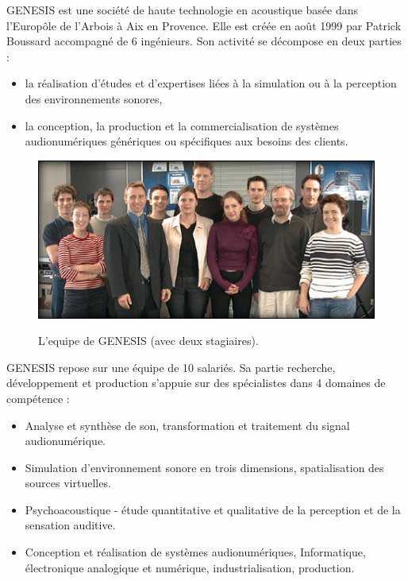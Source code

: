 GENESIS est une soci{\'e}t{\'e} de haute technologie en acoustique bas{\'e}e
dans l'Europ{\^o}le de l'Arbois {\`a} Aix en Provence. Elle est cr{\'e}{\'e}e en
ao{\^u}t 1999 par Patrick Boussard accompagn{\'e} de 6 ing{\'e}nieurs. Son
activit{\'e} se d{\'e}compose en deux parties :\\

\begin{itemize}
   \item la r{\'e}alisation d'{\'e}tudes et d'expertises li{\'e}es {\`a} la simulation
         ou {\`a} la perception des environnements sonores,\\

   \item la conception, la production et la commercialisation de syst{\`e}mes
    audionum{\'e}riques g{\'e}n{\'e}riques ou sp{\'e}cifiques aux besoins des clients.\\
\end{itemize}

\begin{figure}[h]
    \centering
    \includegraphics[width=12cm]{figures/equipe.png}\\
    \caption{L'equipe de GENESIS (avec deux stagiaires).}
    \label{equipe}
\end{figure}

GENESIS repose sur une {\'e}quipe de 10 salari{\'e}s. Sa partie recherche,
d{\'e}veloppement et production s'appuie sur des sp{\'e}cialistes dans 4
domaines de comp{\'e}tence :\\

\begin{itemize}
    \item Analyse et synth{\`e}se de son, transformation et traitement du signal
          audionum{\'e}rique.\\

    \item Simulation d'environnement sonore en trois dimensions, spatialisation
          des sources virtuelles.\\

    \item Psychoacoustique - {\'e}tude quantitative et qualitative de la perception
          et de la sensation auditive.\\

    \item Conception et r{\'e}alisation de syst{\`e}mes audionum{\'e}riques, Informatique,
          {\'e}lectronique analogique et num{\'e}rique, industrialisation, production.\\
\end{itemize}


